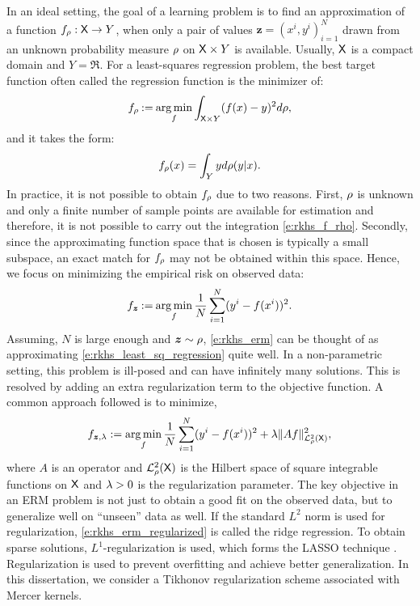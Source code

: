In an ideal setting, the goal of a learning problem is to find an approximation of a function $f_\rho : {\sf X} \to Y$, when only a pair of values $\bm{z} = (x^i, y^i)_{i=1}^N$ drawn from an unknown probability measure $\rho$ on ${\sf X} \times Y$ is available. Usually, ${\sf X}$ is a compact domain and $Y = \Re$. For a least-squares regression problem, the best target function often called the regression function is the minimizer of:
\begin{equation}
f_\pr \eqdef \argmin_f \int_{\state \times Y} (f(x) - y) ^2 d\pr,
\label{e:rkhs_least_sq_regression}
\end{equation}
and it takes the form:
\begin{equation}
f_\pr(x) = \int_Y y d\pr(y|x).
\label{e:rkhs_f_rho}
\end{equation}
In practice, it is not possible to obtain $f_\rho$ due to two reasons. First, $\rho$ is unknown and only a finite number of sample points are available for estimation and therefore, it is not possible to carry out the integration \eqref{e:rkhs_f_rho}. Secondly, since the approximating function space that is chosen is typically a small subspace, an exact match for $f_\rho$ may not be obtained within this space. Hence, we focus on minimizing the empirical risk on observed data:
\begin{equation}
f_{\bm{z}} \eqdef \argmin_f \frac{1}{N} \sum_{i=1}^N (y^i - f(x^i))^2.
\label{e:rkhs_erm}
\end{equation}
Assuming, $N$ is large enough and $\bm{z} \sim \rho$, \eqref{e:rkhs_erm} can be thought of as approximating \eqref{e:rkhs_least_sq_regression} quite well.   In a non-parametric setting, this problem is ill-posed and can have infinitely many solutions. This is resolved by adding an extra regularization term to the objective function. 
A common approach followed is to minimize,
\begin{equation}
f_{\bm{z},\reg} := \argmin_f \frac{1}{N}\sum_{i=1}^N (y^i - f(x^i))^2 + \reg \|A f \|^2_{\mathcal{L}_{\pr}^2(\state)},
\label{e:rkhs_erm_regularized}
\end{equation}
where $A$ is an operator and $\mathcal{L}^2_{\rho}({\sf X})$ is the Hilbert space of square integrable functions on ${\sf X}$ and $\lambda>0$ is the regularization parameter. 
The key objective in an ERM problem is not just to obtain a good fit on the observed data, but to generalize well on ``unseen'' data as well. If the standard $L^2$ norm is used for regularization, \eqref{e:rkhs_erm_regularized} is called the ridge regression. To obtain sparse solutions, $L^1$-regularization is used, which forms the LASSO technique \cite{tiblasso}. Regularization is used to prevent overfitting and achieve better generalization.   In this dissertation, we consider a Tikhonov regularization scheme \cite{tikars79} associated with Mercer kernels.

